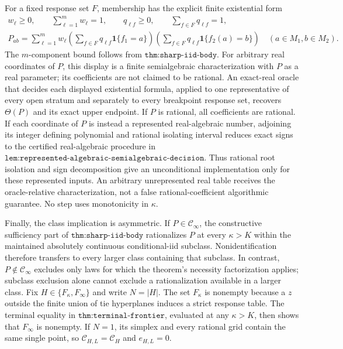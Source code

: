For a fixed response set \(F\), membership has the explicit finite existential form
\[
 \begin{gathered}
 w_\ell\ge0,\qquad \sum_{\ell=1}^{m}w_\ell=1,
 \qquad
 q_{\ell f}\ge0,\qquad \sum_{f\in F}q_{\ell f}=1,\\
 P_{ab}=\sum_{\ell=1}^{m}w_\ell
 \left(\sum_{f\in F}q_{\ell f}\mathbf 1\{f_1=a\}\right)
 \left(\sum_{f\in F}q_{\ell f}\mathbf 1\{f_2(a)=b\}\right)
 \quad(a\in M_1,b\in M_2).
 \end{gathered}
\]
The \(m\)-component bound follows from \(\texttt{thm:sharp-iid-body}\).  For arbitrary real coordinates of \(P\), this display is a finite semialgebraic characterization with \(P\) as a real parameter; its coefficients are not claimed to be rational.  An exact-real oracle that decides each displayed existential formula, applied to one representative of every open stratum and separately to every breakpoint response set, recovers \(\Theta(P)\) and its exact upper endpoint.  If \(P\) is rational, all coefficients are rational.  If each coordinate of \(P\) is instead a represented real-algebraic number, adjoining its integer defining polynomial and rational isolating interval reduces exact signs to the certified real-algebraic procedure in \(\texttt{lem:represented-algebraic-semialgebraic-decision}\).  Thus rational root isolation and sign decomposition give an unconditional implementation only for these represented inputs.  An arbitrary unrepresented real table receives the oracle-relative characterization, not a false rational-coefficient algorithmic guarantee.  No step uses monotonicity in \(\kappa\).

Finally, the class implication is asymmetric.  If \(P\in\mathcal C_\infty\), the constructive sufficiency part of \(\texttt{thm:sharp-iid-body}\) rationalizes \(P\) at every \(\kappa>K\) within the maintained absolutely continuous conditional-iid subclass.  Nonidentification therefore transfers to every larger class containing that subclass.  In contrast, \(P\notin\mathcal C_\infty\) excludes only laws for which the theorem's necessity factorization applies; subclass exclusion alone cannot exclude a rationalization available in a larger class.
Fix \(H\in\{F_\kappa,F_\infty\}\) and write \(N=|H|\).  The set \(F_\kappa\) is nonempty because a \(z\) outside the finite union of tie hyperplanes induces a strict response table.  The terminal equality in \(\texttt{thm:terminal-frontier}\), evaluated at any \(\kappa>K\), then shows that \(F_\infty\) is nonempty.  If \(N=1\), its simplex and every rational grid contain the same single point, so \(\mathcal C_{H,L}=\mathcal C_H\) and \(e_{H,L}=0\).

